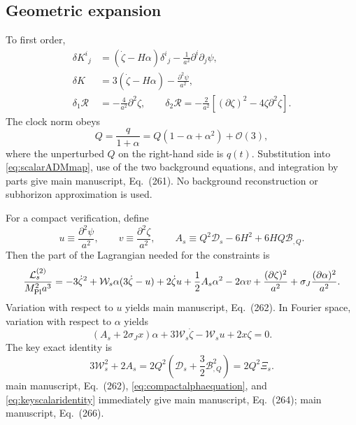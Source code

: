 \documentclass[aps,prd,reprint,onecolumn,notitlepage,nofootinbib,longbibliography,floatfix]{revtex4-2}
\theoremstyle{scstyle}
\theoremstyle{definition}
\theoremstyle{remark}
\newcommand{\mpl}{M_{\rm Pl}}
\newcommand{\cB}{\mathcal B}
\newcommand{\cD}{\mathcal D}
\newcommand{\cO}{\mathcal O}
\begin{document}
\subsection{Geometric expansion}

To first order,
\begin{align}
\delta K^i{}_j
&=\left(\dot\zeta-H\alpha\right)\delta^i{}_j
-\frac{1}{a^2}\partial^i\partial_j\psi,
\label{eq:deltaKijscalar}\\
\delta K
&=3\left(\dot\zeta-H\alpha\right)
-\frac{\partial^2\psi}{a^2},
\label{eq:deltaKscalar}\\
\delta_1\mathcal R
&=-\frac{4}{a^2}\partial^2\zeta,
\qquad
\delta_2\mathcal R
=-\frac{2}{a^2}\left[(\partial\zeta)^2-4\zeta\partial^2\zeta\right].
\label{eq:deltaRscalar}
\end{align}
The clock norm obeys
\begin{equation}
Q=\frac{q}{1+\alpha}
=Q\left(1-\alpha+\alpha^2\right)+\cO(3),
\label{eq:Qalphaexpansion}
\end{equation}
where the unperturbed $Q$ on the right-hand side is $q(t)$. Substitution into \cref{eq:scalarADMmap}, use of the two background equations, and integration by parts give main manuscript, Eq.~(261). No background reconstruction or subhorizon approximation is used.

For a compact verification, define
\begin{equation}
u\equiv\frac{\partial^2\psi}{a^2},
\qquad
v\equiv\frac{\partial^2\zeta}{a^2},
\qquad
A_s\equiv Q^2\cD_s-6H^2+6HQ\cB_{,Q}.
\label{eq:compactscalarvariables}
\end{equation}
Then the part of the Lagrangian needed for the constraints is
\begin{equation}
\frac{\mathcal L_s^{(2)}}{\mpl^2a^3}
=-3\dot\zeta^2+\mathcal W_s\alpha(3\dot\zeta-u)
+2\dot\zeta u+\frac12A_s\alpha^2-2\alpha v
+\frac{(\partial\zeta)^2}{a^2}
+\sigma_J\frac{(\partial\alpha)^2}{a^2}.
\label{eq:compactunreducedscalar}
\end{equation}
Variation with respect to $u$ yields main manuscript, Eq.~(262). In Fourier space, variation with respect to $\alpha$ yields
\begin{equation}
\left(A_s+2\sigma_Jx\right)\alpha
+3\mathcal W_s\dot\zeta-\mathcal W_su+2x\zeta=0.
\label{eq:compactalphaequation}
\end{equation}
The key exact identity is
\begin{equation}
3\mathcal W_s^2+2A_s
=2Q^2\left(\cD_s+\frac32\cB_{,Q}^2\right)
=2Q^2\Xi_s.
\label{eq:keyscalaridentity}
\end{equation}
main manuscript, Eq.~(262), \eqref{eq:compactalphaequation}, and \eqref{eq:keyscalaridentity} immediately give main manuscript, Eq.~(264); main manuscript, Eq.~(266).
\end{document}

